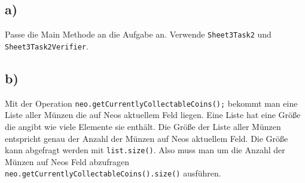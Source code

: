 	\subsection*{a)}
		Passe die Main Methode an die Aufgabe an. Verwende \lstinline{Sheet3Task2} und \lstinline{Sheet3Task2Verifier}.
	\subsection*{b)}
		Mit der Operation \lstinline{neo.getCurrentlyCollectableCoins();} bekommt man eine Liste aller Münzen die auf Neos aktuellem Feld liegen. Eine Liste hat eine Größe die angibt wie viele Elemente sie enthält. Die Größe der Liste aller Münzen entspricht genau der Anzahl der Münzen auf Neos aktuellem Feld. Die Größe kann abgefragt werden mit \lstinline{list.size()}. Also muss man um die Anzahl der Münzen auf Neos Feld abzufragen \lstinline{neo.getCurrentlyCollectableCoins().size()} ausführen.

